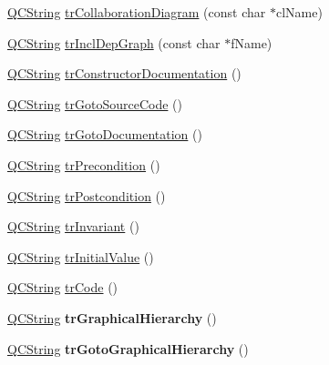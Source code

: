 \begin{DoxyCompactItemize}
\item 
\mbox{\hyperlink{class_q_c_string}{Q\+C\+String}} \mbox{\hyperlink{class_translator_polish_a82e1c3150ac33284de27b9864f9810d1}{tr\+Collaboration\+Diagram}} (const char $\ast$cl\+Name)
\item 
\mbox{\hyperlink{class_q_c_string}{Q\+C\+String}} \mbox{\hyperlink{class_translator_polish_ace0ddab8c25f194d768e54e2753155a1}{tr\+Incl\+Dep\+Graph}} (const char $\ast$f\+Name)
\item 
\mbox{\hyperlink{class_q_c_string}{Q\+C\+String}} \mbox{\hyperlink{class_translator_polish_ab970f1b2df0e95738b3fcff513aa6d57}{tr\+Constructor\+Documentation}} ()
\item 
\mbox{\hyperlink{class_q_c_string}{Q\+C\+String}} \mbox{\hyperlink{class_translator_polish_a1959fa6fb4c06d512d00eb4bf956c27f}{tr\+Goto\+Source\+Code}} ()
\item 
\mbox{\hyperlink{class_q_c_string}{Q\+C\+String}} \mbox{\hyperlink{class_translator_polish_a92dc392aa7ba9219148d55e9ad1ca457}{tr\+Goto\+Documentation}} ()
\item 
\mbox{\hyperlink{class_q_c_string}{Q\+C\+String}} \mbox{\hyperlink{class_translator_polish_a8bae4d23fe88a88ecfa28b8ce6777e4a}{tr\+Precondition}} ()
\item 
\mbox{\hyperlink{class_q_c_string}{Q\+C\+String}} \mbox{\hyperlink{class_translator_polish_a928b04a80930cb2a4bf084fd4c45230a}{tr\+Postcondition}} ()
\item 
\mbox{\hyperlink{class_q_c_string}{Q\+C\+String}} \mbox{\hyperlink{class_translator_polish_a0f58719f4f4754556253f2be4048e146}{tr\+Invariant}} ()
\item 
\mbox{\hyperlink{class_q_c_string}{Q\+C\+String}} \mbox{\hyperlink{class_translator_polish_a675ae7842337be7efe61808e8a079ce8}{tr\+Initial\+Value}} ()
\item 
\mbox{\hyperlink{class_q_c_string}{Q\+C\+String}} \mbox{\hyperlink{class_translator_polish_ae72a70da9005a4d328c5e11a1c6f0057}{tr\+Code}} ()
\item 
\mbox{\label{class_translator_polish_a9e2e9226516e9ee52948de783b75556a}} 
\mbox{\hyperlink{class_q_c_string}{Q\+C\+String}} {\bfseries tr\+Graphical\+Hierarchy} ()
\item 
\mbox{\label{class_translator_polish_a0acf5f84b9ed46e55c59399a00760a96}} 
\mbox{\hyperlink{class_q_c_string}{Q\+C\+String}} {\bfseries tr\+Goto\+Graphical\+Hierarchy} ()

\end{DoxyCompactItemize}
